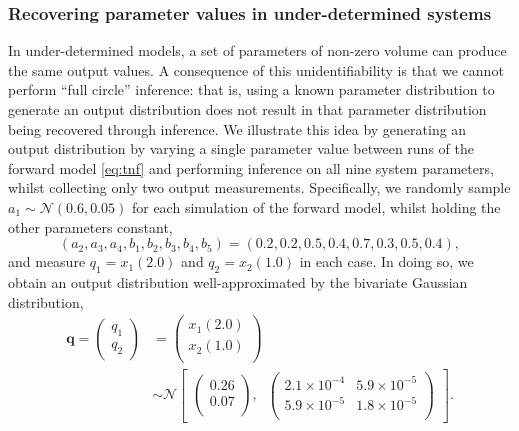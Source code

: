 \subsubsection{Recovering parameter values in under-determined systems}
In under-determined models, a set of parameters of non-zero volume can produce the same output values. A consequence of this unidentifiability is that we cannot perform ``full circle'' inference: that is, using a known parameter distribution to generate an output distribution does not result in that parameter distribution being recovered through inference. We illustrate this idea by generating an output distribution by varying a single parameter value between runs of the forward model \eqref{eq:tnf} and performing inference on all nine system parameters, whilst collecting only two output measurements. Specifically, we randomly sample $a_1\sim \mathcal{N}(0.6, 0.05)$ for each simulation of the forward model, whilst holding the other parameters constant, $$(a_2,a_3,a_4,b_1,b_2,b_3,b_4,b_5)=(0.2, 0.2, 0.5, 0.4, 0.7, 0.3, 0.5, 0.4),$$ and measure $q_1=x_1(2.0)$ and $q_2=x_2(1.0)$ in each case. In doing so, we obtain an output distribution well-approximated by the bivariate Gaussian distribution,
%
\begin{equation}\label{eq:tnf_circular_target}
\begin{aligned}
\boldsymbol{q} = \begin{pmatrix} q_1 \\ q_2 \end{pmatrix}
&=
\begin{pmatrix}
x_1(2.0)\\
x_2(1.0)\\
\end{pmatrix} \\
&\sim  \mathcal{N}
\begin{bmatrix}
\begin{pmatrix}
0.26\\
0.07\\
\end{pmatrix}, \;\;
\begin{pmatrix}
2.1\times 10^{-4} & 5.9\times 10^{-5}\\
5.9\times 10^{-5} & 1.8\times 10^{-5}\\
\end{pmatrix}
\end{bmatrix}.
\end{aligned}
\end{equation}
%
